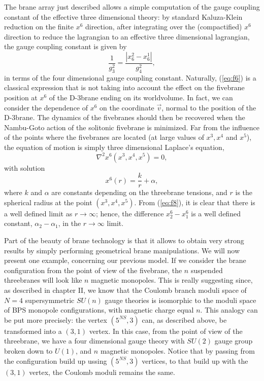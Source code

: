 The brane array just described allows a simple computation of the
gauge coupling constant of the effective three dimensional
theory: by standard Kaluza-Klein reduction on the finite $x^6$
direction, after 
integrating over the (compactified) $x^6$ direction to reduce the lagrangian 
to an effective three dimensional lagrangian, the gauge coupling constant is given by
\begin{equation}
\frac {1}{g_3^2} = \frac {|x_6^2-x_6^1|}{g_4^2},
\label{eq:f6}
\end{equation}
in terms of the four dimensional gauge coupling constant.
Naturally, (\ref{eq:f6}) is a classical expression that is not
taking into account the effect on the fivebrane position at $x^6$
of the D-$3$brane ending on its worldvolume. In fact, we can
consider the dependence of $x^6$ on the coordinate $\vec{v}$,
normal to the position of the D-$3$brane. The dynamics of the
fivebranes should then be recovered when the Nambu-Goto action of
the solitonic fivebrane is minimized. Far from the influence of
the points where the fivebranes are located (at large values of
$x^3,x^4$ and $x^5$), the equation of motion is simply three
dimensional Laplace's equation,
\begin{equation}
\nabla^2 x^6(x^3,x^4,x^5)=0,
\label{eq:f7}
\end{equation}
with solution 
\begin{equation}
x^6(r)= \frac {k}{r} + \alpha,
\label{eq:f8}
\end{equation}
where $k$ and $\alpha$ are constants depending on the threebrane tensions, 
and $r$ is the spherical
radius at the point $(x^3,x^4,x^5)$. From (\ref{eq:f8}), it is
clear that there is a well defined limit as $r \rightarrow
\infty$; hence, the difference $x^6_2-x^6_1$ is a well defined
constant, $\alpha_2-\alpha_1$, in the $r \rightarrow \infty$
limit.
  
Part of the beauty of brane technology is that it allows to
obtain very strong results by simply performing geometrical brane
manipulations. We will now present one example, concerning our
previous model. If we consider the brane configuration from the
point of view of the fivebrane, the $n$ suspended threebranes
will look like $n$ magnetic monopoles. This is really suggesting
since, as described in chapter II, we know that the Coulomb
branch moduli space of $N=4$ supersymmetric $SU(n)$ gauge
theories is isomorphic to the moduli space of BPS monopole
configurations, with magnetic charge equal $n$. This analogy can
be put more precisely: the vertex $(5^{NS},3)$ can, as described
above, be transformed into a $(3,1)$ vertex. In this case, from
the point of view of the threebrane, we have a four dimensional
gauge theory with $SU(2)$ gauge group broken down to $U(1)$, and
$n$ magnetic monopoles. Notice that by passing from the
configuration build up ussing $(5^{NS},3)$ vertices, to that
build up with the $(3,1)$ vertex, the Coulomb moduli remains the
same.
  
